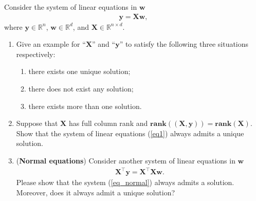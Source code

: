 \documentclass[11pt,letter,notitlepage]{article}
\newcommand{\rank}[1]{ \textbf{rank}  (#1)  }
\begin{document}
\newpage



\begin{exercise}

    Consider the system of linear equations in $\mathbf{w}$
    \begin{align}\label{eq1}
        \mathbf{y} = \mathbf{X} \mathbf{w} ,
    \end{align}
    where $\mathbf{y} \in \mathbb{R}^{n}$, $\mathbf{w} \in \mathbb{R}^{d}$, and $\mathbf{X} \in \mathbb{R}^{n \times d}$.

    \begin{enumerate}
        \item Give an example for ``$\mathbf{X}$'' and ``$\mathbf{y}$'' to satisfy the following three situations respectively:
              \begin{enumerate}
                  \item there exists one unique solution;
                  \item there does not exist any solution;
                  \item there exists more than one solution.
              \end{enumerate}

        \item Suppose that $\mathbf{X}$ has full column rank and $\rank{(\mathbf{X}, \mathbf{y})} = \rank{\mathbf{X}}$. Show that the system of linear equations (\ref{eq1}) always admits a unique solution.

        \item (\textbf{Normal equations}) Consider  another system of linear equations in $\mathbf{w}$
              \begin{align}\label{eq_normal}
                  \mathbf{X}^{\top}\mathbf{y} = \mathbf{X}^{\top}\mathbf{X}\mathbf{w}.
              \end{align}
              Please show that the system (\ref{eq_normal}) always admits a solution. Moreover, does it always admit a unique solution?
    \end{enumerate}

\end{exercise}
\end{document}
